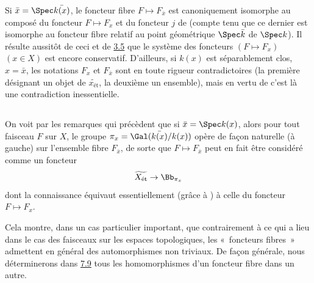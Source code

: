 \documentclass[10pt]{../fichiers-configuration-latex/smfart}
\begin{document}
Si $\bar{x} = \Spec \bar{k(x)}$, le foncteur fibre $F \mapsto
F_{\bar{x}}$ est canoniquement isomorphe au composé du foncteur $F
\mapsto F_x$ et du foncteur $j$ de  (compte tenu que ce dernier est
isomorphe au foncteur fibre relatif au point géométrique $\Spec
\bar{k}$ de $\Spec k$). Il résulte aussitôt de ceci et de
\hyperref[VIII.thm3.5]{3.5} que le
système des foncteurs $(F \mapsto F_x)$ $(x \in X)$ est encore
conservatif. D'ailleurs, si $k(x)$ est séparablement clos, \ie $x =
\bar{x}$, les notations $F_x$ et $F_{\bar{x}}$ sont en toute rigueur
contradictoires (la première désignant un objet de
$\widetilde{x_{\text{ét}}}$, la deuxième un ensemble), mais en vertu de
 c'est là une contradiction inessentielle.

\subsection{}

On voit par les remarques qui précèdent que si $\bar{x} = \Spec
k(x)$, alors pour tout faisceau $F$ sur $X$, le groupe $\pi_x = \Gal
(\bar{k(x)}/ k(x))$ opère de façon naturelle (à gauche) sur
l'ensemble fibre $F_{\bar{x}}$, de sorte que $F \mapsto F_{\bar{x}}$
peut en fait être considéré comme un foncteur
$$
\widetilde{X_{\text{ét}}} \to \Bb_{\pi_x}
$$
dont la connaissance équivaut essentiellement (grâce à
) à celle du
foncteur $F \mapsto F_x$.

Cela montre, dans un cas particulier important, que contrairement à ce
qui a lieu dans le cas des faisceaux sur les espaces topologiques, les
« foncteurs fibres » admettent en général des automorphismes non
triviaux. De façon générale, nous déterminerons dans \hyperref[VIII.thm7.9]{7.9} tous les
homomorphismes d'un foncteur fibre dans un autre.
\end{document}
